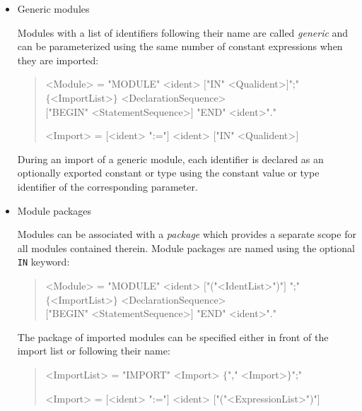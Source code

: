 \begin{itemize}

\item Generic modules

Modules with a list of identifiers following their name are called \emph{generic} and can be parameterized using the same number of constant expressions when they are imported:

\begin{quote}\begin{grammar}
<Module> = "MODULE" <ident>  $[$"IN" <Qualident>$]$";" \\ $\{$<ImportList>$\}$ <DeclarationSequence> \\ $[$"BEGIN" <StatementSequence>$]$ "END" <ident>"." \par
<Import> = $[$<ident> ":="$]$ <ident>  $[$"IN" <Qualident>$]$\par
\end{grammar}\end{quote}

During an import of a generic module, each identifier is declared as an optionally exported constant or type using the constant value or type identifier of the corresponding parameter.

\item Module packages

Modules can be associated with a \emph{package} which provides a separate scope for all modules contained therein.
Module packages are named using the optional \texttt{IN} keyword:

\begin{quote}\begin{grammar}
<Module> = "MODULE" <ident> $[$"("<IdentList>")"$]$ ";" \\ $\{$<ImportList>$\}$ <DeclarationSequence> \\ $[$"BEGIN" <StatementSequence>$]$ "END" <ident>"." \par
\end{grammar}\end{quote}

The package of imported modules can be specified either in front of the import list or following their name:

\begin{quote}\begin{grammar}
<ImportList> =  "IMPORT" <Import> $\{$"," <Import>$\}$";" \par
<Import> = $[$<ident> ":="$]$ <ident> $[$"("<ExpressionList>")"$]$  \par
\end{grammar}\end{quote}


\end{itemize}
